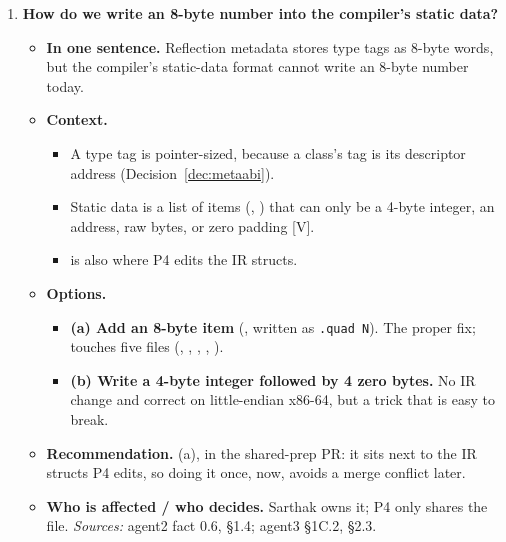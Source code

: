 \documentclass[10pt]{article}
\newcommand{\code}[1]{\texttt{\small #1}}
\newcommand{\mV}{\textsf{\scriptsize[V]}}
\newcommand{\field}[1]{\textbf{#1}\enspace}
\newcommand{\decitem}[1]{\needspace{6\baselineskip}\setcounter{enumi}{\numexpr#1-1\relax}\item}
\begin{document}
\begin{enumerate}[label=\textbf{\arabic*.},ref=\arabic*,leftmargin=1.8em,itemsep=0.8em]
\decitem{7}\label{dec:word}\textbf{How do we write an 8-byte number into the compiler's static data?}
\begin{itemize}
\item[] \field{In one sentence.} Reflection metadata stores type tags as 8-byte words, but the compiler's static-data format cannot write an 8-byte number today.
\item[] \field{Context.}
\begin{itemize}
\item A type tag is pointer-sized, because a class's tag is its descriptor address (Decision~\ref{dec:metaabi}).
\item Static data is a list of items (, ) that can only be a 4-byte integer, an address, raw bytes, or zero padding \mV.
\item {} is also where P4 edits the IR structs.
\end{itemize}
\item[] \field{Options.}
\begin{itemize}
\item \textbf{(a) Add an 8-byte item} (, written as \code{.quad N}). The proper fix; touches five files (, , , , ).
\item \textbf{(b) Write a 4-byte integer followed by 4 zero bytes.} No IR change and correct on little-endian x86-64, but a trick that is easy to break.
\end{itemize}
\item[] \field{Recommendation.} (a), in the shared-prep PR: it sits next to the IR structs P4 edits, so doing it once, now, avoids a merge conflict later.
\item[] \field{Who is affected / who decides.} Sarthak owns it; P4 only shares the file. \emph{Sources:} agent2 fact 0.6, §1.4; agent3 §1C.2, §2.3.
\end{itemize}


\end{enumerate}
\end{document}

